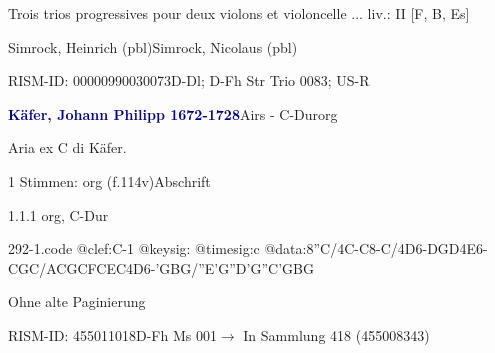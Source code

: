 \documentclass[twocolumn, 12pt]{book}
\begin{document}
\par \begin{itshape}Trois trios progressives pour deux violons et violoncelle ... liv.: II [F, B, Es]\end{itshape} \newline Simrock, Heinrich  (pbl)\newline Simrock, Nicolaus  (pbl)
\par RISM-ID: 00000990030073\newline D-Dl; D-Fh  Str Trio 0083; US-R
\par \vspace{16pt} \textcolor{darkblue}{\textbf{Käfer, Johann Philipp  1672-1728}}\hfillplus{\textbf{[292]}}\newline Airs - C-Dur\newline org
\par \begin{itshape}[f.114v, heading:] Aria ex C di Käfer.\end{itshape} 
\par \textcolor{darkblue}{}  1 Stimmen: org  (f.114v)\newline Abschrift
\par 1.1.1  org, C-Dur  
\begin{filecontents*}{292-1.code}
@clef:C-1
@keysig:
@timesig:c
@data:8''C/4C-C8-C/4D6-{DGD}4E6-{CGC}/{ACGC}{FCEC}4D6-{'GBG}/{''E'G''D'G}{''C'GBG}
\end{filecontents*}
\newline %
\par Ohne alte Paginierung
\par RISM-ID: 455011018\newline D-Fh  Ms 001\newline $\rightarrow$ In Sammlung 418 (455008343)
      
\end{document}
